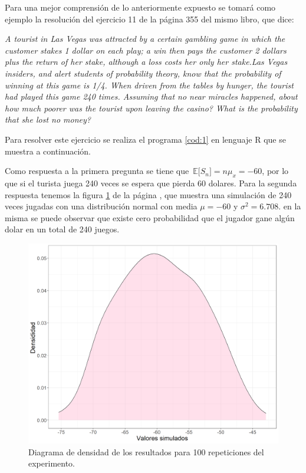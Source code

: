\documentclass{article}
\newcommand\espe[1]{\, \mathbb{E} \lbrack #1 \rbrack}
\begin{document}
 Para una mejor comprensión de lo anteriormente expuesto se tomará como ejemplo la resolución del ejercicio 11 de la página 355 del mismo libro, que dice:
 
\textit{A tourist in Las Vegas was attracted by a certain gambling game in which the customer stakes 1 dollar on each play; a win then pays the customer 2 dollars plus the return of her stake, although a loss costs her only her stake.Las Vegas insiders, and alert students of probability theory, know that the probability of winning at this game is 1/4. When driven from the tables by hunger, the tourist had played this game 240 times. Assuming that no near miracles happened, about how much poorer was the tourist upon leaving the casino? What is the probability that she lost no money?
} 

Para resolver este ejercicio se realiza el programa \ref{cod:1} en lenguaje R \cite{R} que se muestra a continuación.

\begin{center}

\label{cod:1}
\end{center}
 Como respuesta a la primera pregunta se tiene que $\espe{S_n}= n\mu_{x}=-60$, por lo que si el turista juega 240 veces se espera que pierda 60 dolares. Para la segunda respuesta tenemos la figura \ref{fig:1} de la página \pageref{fig:1}, que muestra una simulación de 240 veces jugadas con una distribución normal con media $\mu= -60$ y $\sigma^{2} = 6.708$. en la misma se puede observar que existe cero probabilidad que el jugador gane algún dolar en un total de 240 juegos.  
 \vspace{-0.5cm}
\begin{figure}
    \centering
    \includegraphics[scale=0.35]{figuras/ejercicio11.png}
    \caption{Diagrama de densidad de los resultados para 100 repeticiones del experimento.}
    \label{fig:1}
\end{figure}
\end{document}
